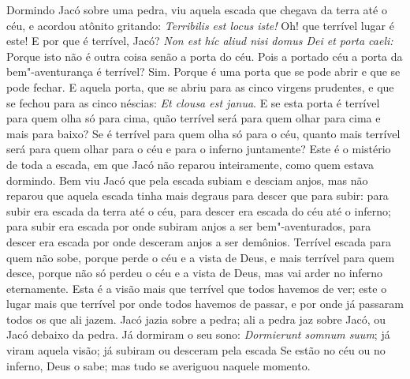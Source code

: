 Dormindo Jacó sobre uma pedra, viu aquela escada que chegava da terra
até o céu, e acordou atônito gritando: \emph{Terribilis est locus iste!}
Oh! que terrível lugar é este! E por que é terrível, Jacó? %
\emph{Non est híc aliud nisi domus Dei et porta caeli:} Porque isto não
é outra coisa senão a porta do céu. Pois a portado céu a porta da
bem"-aventurança é terrível? Sim. Porque é uma porta que se pode abrir e
que se pode fechar. E aquela porta, que se abriu para as cinco virgens
prudentes, e que se fechou para as cinco néscias: \emph{Et clousa est
janua}. E se esta porta é terrível para quem olha só para %
cima, quão terrível será para quem olhar para cima e mais para baixo? Se
é terrível para quem olha só para o céu, quanto mais terrível será para
quem olhar para o céu e para o inferno juntamente? Este é o mistério de
toda a escada, em que Jacó não reparou inteiramente, como quem estava
dormindo. Bem viu Jacó que pela escada subiam e desciam anjos, mas não
reparou que aquela escada tinha mais degraus para descer que para subir:
para subir era escada da terra até o céu, para descer era escada do céu
até o inferno; para subir era escada por onde subiram anjos a ser bem"-aventurados, para descer era escada por onde desceram anjos a ser
demônios. Terrível escada para quem não sobe, porque perde o céu e a
vista de Deus, e mais terrível para quem desce, porque não só perdeu o
céu e a vista de Deus, mas vai arder no inferno eternamente. Esta é a
visão mais que terrível que todos havemos de ver; este o lugar mais que
terrível por onde todos havemos de passar, e por onde já passaram todos
os que ali jazem. Jacó jazia sobre a pedra; ali a pedra jaz sobre Jacó,
ou Jacó debaixo da pedra. Já dormiram o seu sono: \emph{Dormierunt
somnum suum}; já viram aquela visão; já subiram ou desceram 
pela escada Se estão no céu ou no inferno, Deus o sabe; mas tudo se
averiguou naquele momento.

